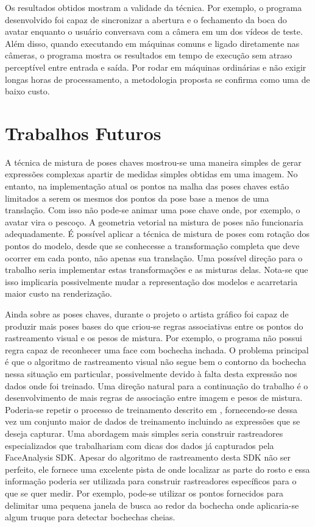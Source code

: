 Os resultados obtidos mostram a validade da técnica. Por exemplo, o programa desenvolvido foi capaz de sincronizar a abertura e o fechamento da boca do avatar enquanto o usuário conversava com a câmera em um dos vídeos de teste. Além disso, quando executando em máquinas comuns e ligado diretamente nas câmeras, o programa mostra os resultados em tempo de execução sem atraso perceptível entre entrada e saída. Por rodar em máquinas ordinárias e não exigir longas horas de processamento, a metodologia proposta se confirma como uma de baixo custo.



\section{Trabalhos Futuros}

A técnica de mistura de poses chaves mostrou-se uma maneira simples de gerar expressões complexas apartir de medidas simples obtidas em uma imagem. No entanto, na implementação atual os pontos na malha das poses chaves estão limitados a serem os mesmos dos pontos da pose base a menos de uma translação. Com isso não pode-se animar uma pose chave onde, por exemplo, o avatar vira o pescoço. A geometria vetorial na mistura de poses não funcionaria adequadamente. É possível aplicar a técnica de mistura de poses com rotação dos pontos do modelo, desde que se conhecesse a transformação completa que deve ocorrer em cada ponto, não apenas sua translação. Uma possível direção para o trabalho seria implementar estas transformações e as misturas delas. Nota-se que isso implicaria possivelmente mudar a representação dos modelos e acarretaria maior custo na renderização. 

Ainda sobre as poses chaves, durante o projeto o artista gráfico foi capaz de produzir mais poses bases do que criou-se regras associativas entre os pontos do rastreamento visual e os pesos de mistura. Por exemplo, o programa não possui regra capaz de reconhecer uma face com bochecha inchada. O problema principal é que o algoritmo de rastreamento visual não segue bem o contorno da bochecha nessa situação em particular, possivelmente devido à falta desta expressão nos dados onde foi treinado. Uma direção natural para a continuação do trabalho é o desenvolvimento de mais regras de associação entre imagem e pesos de mistura. Poderia-se repetir o processo de treinamento descrito em \cite{facetracker}, fornecendo-se dessa vez um conjunto maior de dados de treinamento incluindo as expressões que se deseja capturar. Uma abordagem mais simples seria construir rastreadores especializados que trabalhariam com dicas dos dados já capturados pela FaceAnalysis SDK. Apesar do algoritmo de rastreamento desta SDK não ser perfeito, ele fornece uma excelente pista de onde localizar as parte do rosto e essa informação poderia ser utilizada para construir rastreadores específicos para o que se quer medir. Por exemplo, pode-se utilizar os pontos fornecidos para delimitar uma pequena janela de busca ao redor da bochecha onde aplicaria-se algum truque para detectar bochechas cheias.

